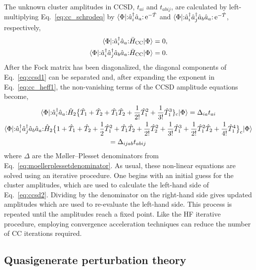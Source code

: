 The unknown cluster amplitudes in CCSD, $t_{a i}$ and $t_{a b i j}$, are calculated by left-multiplying Eq.\ \eqref{eq:cc_schrodeq} by $\langle \Phi | \mathopen: \hat a_i^\dagger \hat a_a \mathclose: \operatorname{e}^{-\hat{T}}$ and $\langle \Phi | \mathopen: \hat a_i^\dagger \hat a_j^\dagger \hat a_b \hat a_a \mathclose: \operatorname{e}^{-\hat{T}}$, respectively,
\begin{align} \label{eq:ccsd1}
  \langle \Phi | \mathopen: \hat a_i^\dagger \hat a_a \mathclose: \bar{H}_{\mathrm{CC}} | \Phi \rangle &= 0, \\
  \langle \Phi | \mathopen: \hat a_i^\dagger \hat a_j^\dagger \hat a_b \hat a_a \mathclose:\bar{H}_{\mathrm{CC}} | \Phi \rangle &= 0. \notag
\end{align}
After the Fock matrix has been diagonalized, the diagonal components of Eq.\ \eqref{eq:ccsd1} can be separated and, after expanding the exponent in Eq.\ \eqref{eq:cc_heff1}, the non-vanishing terms of the CCSD amplitude equations become,
\begin{gather} \label{eq:ccsd2}
  \langle \Phi | \mathopen: \hat a_i^\dagger \hat a_a \mathclose: \hat{H}_2 \bigl\{\hat{T}_1 + \hat{T}_2 + \hat{T}_1\hat{T}_2 + \frac{1}{2!} \hat{T}_1^{2} + \frac{1}{3!} \hat{T}_1^{3}\}_{\mathrm{c}} | \Phi \rangle = \Delta_{i a} t_{a i} \\
  \langle \Phi | \mathopen: \hat a_i^\dagger \hat a_j^\dagger \hat a_b \hat a_a \mathclose: \hat{H}_2 \bigl\{1 + \hat{T}_1 + \hat{T}_2 + \frac{1}{2} \hat{T}_1^{2} + \hat{T}_1\hat{T}_2 + \frac{1}{2!} \hat{T}_2^{2} + \frac{1}{3!} \hat{T}_1^{3} + \frac{1}{2!} \hat{T}_1^{2} \hat{T}_2 + \frac{1}{4!} \hat{T}_1^{4}\bigr\}_{\mathrm{c}} | \Phi \rangle \notag \\
= \Delta_{i j a b} t_{a b i j} \notag
\end{gather}
where $\Delta$ are the M\o ller--Plesset denominators from Eq.\ \eqref{eq:moellerplessetdenominator}.  As usual, these non-linear equations are solved using an iterative procedure.  One begins with an initial guess for the cluster amplitudes, which are used to calculate the left-hand side of Eq.\ \eqref{eq:ccsd2}.  Dividing by the denominator on the right-hand side gives updated amplitudes which are used to re-evaluate the left-hand side. This process is repeated until the amplitudes reach a fixed point.  Like the HF iterative procedure, employing convergence acceleration techniques can reduce the number of CC iterations required.

\subsection{Quasigenerate perturbation theory}
\label{subsec:selfenergy}

